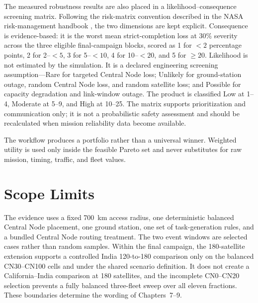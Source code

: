 The measured robustness results are also placed in a likelihood--consequence screening matrix. Following the risk-matrix convention described in the NASA risk-management handbook \citep{NASA2024RiskManagement}, the two dimensions are kept explicit. Consequence is evidence-based: it is the worst mean strict-completion loss at 30\% severity across the three eligible final-campaign blocks, scored as 1 for $<2$ percentage points, 2 for 2--$<5$, 3 for 5--$<10$, 4 for 10--$<20$, and 5 for $\geq20$. Likelihood is not estimated by the simulation. It is a declared engineering screening assumption---Rare for targeted Central Node loss; Unlikely for ground-station outage, random Central Node loss, and random satellite loss; and Possible for capacity degradation and link-window outage. The product is classified Low at 1--4, Moderate at 5--9, and High at 10--25. The matrix supports prioritization and communication only; it is not a probabilistic safety assessment and should be recalculated when mission reliability data become available.

The workflow produces a portfolio rather than a universal winner. Weighted utility is used only inside the feasible Pareto set and never substitutes for raw mission, timing, traffic, and fleet values.

\section{Scope Limits}

The evidence uses a fixed \SI{700}{\kilo\metre} access radius, one deterministic balanced Central Node placement, one ground station, one set of task-generation rules, and a bundled Central Node routing treatment. The two event windows are selected cases rather than random samples. Within the final campaign, the 180-satellite extension supports a controlled India 120-to-180 comparison only on the balanced CN30--CN100 cells and under the shared scenario definition. It does not create a California--India comparison at 180 satellites, and the incomplete CN0--CN20 selection prevents a fully balanced three-fleet sweep over all eleven fractions. These boundaries determine the wording of Chapters~7--9.
